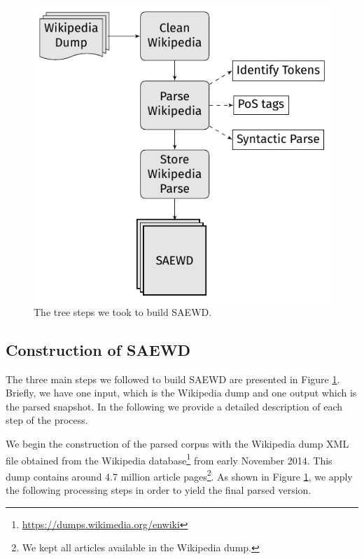 \begin{figure}[t]

	\centering
	\includegraphics[scale=.8]{images/Chapitre7/flow_chart.pdf}
	\caption{The tree steps we took to build SAEWD.}
	\label{fig:flow}
\end{figure}

\subsection{Construction of SAEWD}
The three main steps we followed to build SAEWD are presented in Figure \ref{fig:flow}. Briefly, we have one input, which is the Wikipedia dump and one output which is the parsed snapshot. In the following we provide a detailed description of each step of the process. 

 
We begin the construction of the parsed corpus with the Wikipedia dump XML file obtained from the Wikipedia database\footnote{\url{https://dumps.wikimedia.org/enwiki}} from early November 2014. This dump  contains around 4.7 million article pages\footnote{We kept all articles available in the Wikipedia dump.}. As shown in Figure \ref{fig:flow}, we apply the following processing steps in order to yield the final parsed version.
 
